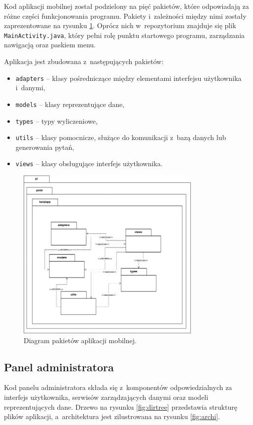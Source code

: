 \documentclass[a4paper,twoside,12pt]{book}
\begin{document}
Kod aplikacji mobilnej został podzielony na pięć pakietów, które odpowiadają za różne części funkcjonowania programu. Pakiety i~zależności między nimi zostały zaprezentowane na rysunku \ref{fig:package}. Oprócz nich w~repozytorium znajduje się plik \texttt{MainActivity.java}, który pełni rolę punktu startowego programu, zarządzania nawigacją oraz paskiem menu. 

Aplikacja jest zbudowana z~następujących pakietów:
\begin{itemize}
\item \texttt{adapters} -- klasy pośredniczące między elementami interfejsu użytkownika i~danymi,
\item \texttt{models} -- klasy reprezentujące dane,
\item \texttt{types} -- typy wyliczeniowe,
\item \texttt{utils} -- klasy pomocnicze, służące do komunikacji z~bazą danych lub generowania pytań,
\item \texttt{views} -- klasy obsługujące interfejs użytkownika.
\end{itemize} 
\begin{figure}[]
\centering
\includegraphics[width=0.8\textwidth]{packages}
\caption{Diagram pakietów aplikacji mobilnej.}
\label{fig:package}
\end{figure}

\subsection{Panel administratora}

Kod panelu administratora składa się z~komponentów odpowiedzialnych za interfejs użytkownika, serwisów zarządzających danymi oraz modeli reprezentujących dane. Drzewo na rysunku \ref{fig:dirtree} przedstawia strukturę plików aplikacji, a~architektura jest zilustrowana na rysunku \ref{fig:archi}.
\end{document}

